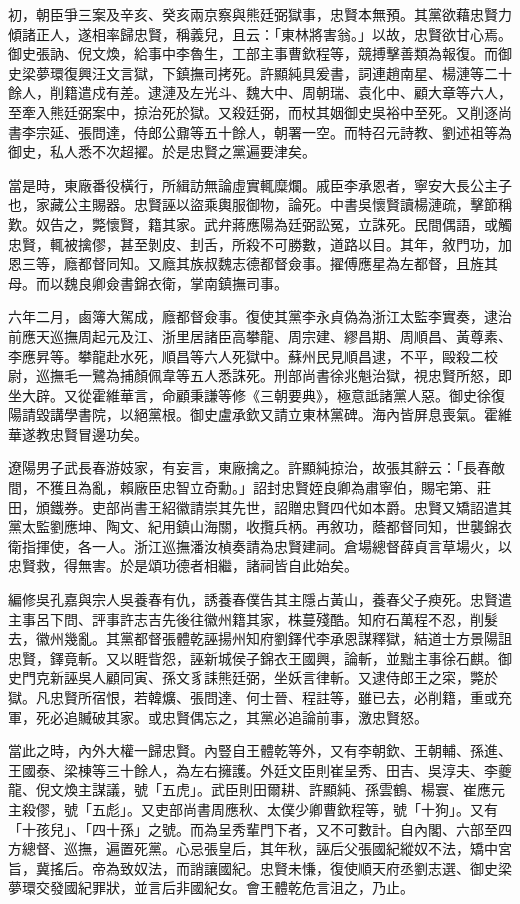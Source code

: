 \begin{pinyinscope}
初，朝臣爭三案及辛亥、癸亥兩京察與熊廷弼獄事，忠賢本無預。其黨欲藉忠賢力傾諸正人，遂相率歸忠賢，稱義兒，且云：「東林將害翁。」以故，忠賢欲甘心焉。御史張訥、倪文煥，給事中李魯生，工部主事曹欽程等，競搏擊善類為報復。而御史梁夢環復興汪文言獄，下鎮撫司拷死。許顯純具爰書，詞連趙南星、楊漣等二十餘人，削籍遣戍有差。逮漣及左光斗、魏大中、周朝瑞、袁化中、顧大章等六人，至牽入熊廷弼案中，掠治死於獄。又殺廷弼，而杖其姻御史吳裕中至死。又削逐尚書李宗延、張問達，侍郎公鼐等五十餘人，朝署一空。而特召元詩教、劉述祖等為御史，私人悉不次超擢。於是忠賢之黨遍要津矣。

當是時，東廠番役橫行，所緝訪無論虛實輒糜爛。戚臣李承恩者，寧安大長公主子也，家藏公主賜器。忠賢誣以盜乘輿服御物，論死。中書吳懷賢讀楊漣疏，擊節稱歎。奴告之，斃懷賢，籍其家。武弁蔣應陽為廷弼訟冤，立誅死。民間偶語，或觸忠賢，輒被擒僇，甚至剝皮、刲舌，所殺不可勝數，道路以目。其年，敘門功，加恩三等，廕都督同知。又廕其族叔魏志德都督僉事。擢傅應星為左都督，且旌其母。而以魏良卿僉書錦衣衛，掌南鎮撫司事。

六年二月，鹵簿大駕成，廕都督僉事。復使其黨李永貞偽為浙江太監李實奏，逮治前應天巡撫周起元及江、浙里居諸臣高攀龍、周宗建、繆昌期、周順昌、黃尊素、李應昇等。攀龍赴水死，順昌等六人死獄中。蘇州民見順昌逮，不平，毆殺二校尉，巡撫毛一鷺為捕顏佩韋等五人悉誅死。刑部尚書徐兆魁治獄，視忠賢所怒，即坐大辟。又從霍維華言，命顧秉謙等修《三朝要典》，極意詆諸黨人惡。御史徐復陽請毀講學書院，以絕黨根。御史盧承欽又請立東林黨碑。海內皆屏息喪氣。霍維華遂教忠賢冒邊功矣。

遼陽男子武長春游妓家，有妄言，東廠擒之。許顯純掠治，故張其辭云：「長春敵間，不獲且為亂，賴廠臣忠智立奇勳。」詔封忠賢姪良卿為肅寧伯，賜宅第、莊田，頒鐵券。吏部尚書王紹徽請崇其先世，詔贈忠賢四代如本爵。忠賢又矯詔遣其黨太監劉應坤、陶文、紀用鎮山海關，收攬兵柄。再敘功，蔭都督同知，世襲錦衣衛指揮使，各一人。浙江巡撫潘汝楨奏請為忠賢建祠。倉場總督薛貞言草場火，以忠賢救，得無害。於是頌功德者相繼，諸祠皆自此始矣。

編修吳孔嘉與宗人吳養春有仇，誘養春僕告其主隱占黃山，養春父子瘐死。忠賢遣主事呂下問、評事許志吉先後往徽州籍其家，株蔓殘酷。知府石萬程不忍，削髮去，徽州幾亂。其黨都督張體乾誣揚州知府劉鐸代李承恩謀釋獄，結道士方景陽詛忠賢，鐸竟斬。又以睚眥怨，誣新城侯子錦衣王國興，論斬，並黜主事徐石麒。御史門克新誣吳人顧同寅、孫文豸誄熊廷弼，坐妖言律斬。又逮侍郎王之寀，斃於獄。凡忠賢所宿恨，若韓爌、張問達、何士晉、程註等，雖已去，必削籍，重或充軍，死必追贓破其家。或忠賢偶忘之，其黨必追論前事，激忠賢怒。

當此之時，內外大權一歸忠賢。內豎自王體乾等外，又有李朝欽、王朝輔、孫進、王國泰、梁棟等三十餘人，為左右擁護。外廷文臣則崔呈秀、田吉、吳淳夫、李夔龍、倪文煥主謀議，號「五虎」。武臣則田爾耕、許顯純、孫雲鶴、楊寰、崔應元主殺僇，號「五彪」。又吏部尚書周應秋、太僕少卿曹欽程等，號「十狗」。又有「十孩兒」、「四十孫」之號。而為呈秀輩門下者，又不可數計。自內閣、六部至四方總督、巡撫，遍置死黨。心忌張皇后，其年秋，誣后父張國紀縱奴不法，矯中宮旨，冀搖后。帝為致奴法，而誚讓國紀。忠賢未慊，復使順天府丞劉志選、御史梁夢環交發國紀罪狀，並言后非國紀女。會王體乾危言沮之，乃止。


\end{pinyinscope}
